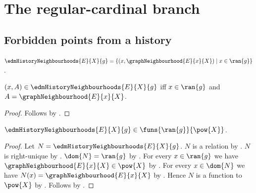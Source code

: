 \section{The regular-cardinal branch}










\subsection{Forbidden points from a history}

\begin{definition}\label{edm_history_neighbourhoods}
    $\edmHistoryNeighbourhoods{E}{X}{g}
        =\{(x,\graphNeighbourhood{E}{x}{X})\mid x\in\ran{g}\}$.
\end{definition}

\begin{proposition}\label{edm_history_neighbourhoods_iff}
    $(x,A)\in\edmHistoryNeighbourhoods{E}{X}{g}$ iff
        $x\in\ran{g}$ and $A=\graphNeighbourhood{E}{x}{X}$.
\end{proposition}
\begin{proof}
    Follows by .
\end{proof}

\begin{theorem}\label{edm_history_neighbourhoods_type}
    $\edmHistoryNeighbourhoods{E}{X}{g}
        \in\funs{\ran{g}}{\pow{X}}$.
\end{theorem}
\begin{proof}
    Let $N=\edmHistoryNeighbourhoods{E}{X}{g}$.
    $N$ is a relation by
        .
    $N$ is right-unique by
        .
    $\dom{N}=\ran{g}$ by
        .
    For every $x\in\ran{g}$ we have
        $\graphNeighbourhood{E}{x}{X}\in\pow{X}$ by
        .
    For every $x\in\dom{N}$ we have
        $N(x)=\graphNeighbourhood{E}{x}{X}$ by
        .
    Hence $N$ is a function to $\pow{X}$ by \auto.
    Follows by .
\end{proof}

